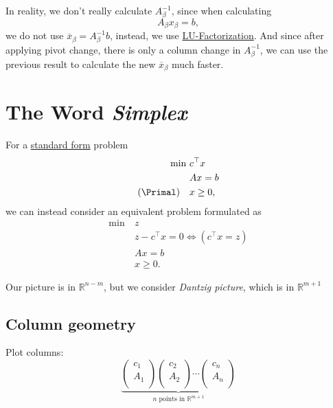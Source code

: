 \begin{note}
	In reality, we don't really calculate \(A^{-1}_{\beta}\), since when calculating
	\[
		A_{\beta}x_{\beta} = b,
	\]
	we do not use \(\overline{x}_{\beta} = A^{-1}_{\beta}b\), instead, we use \href{https://en.wikipedia.org/wiki/LU_decomposition}{LU-Factorization}. And since after applying pivot change, there is only a column change in \(A^{-1}_{\beta}\), we can use the previous result to calculate the new \(\overline{x}_{\beta}\) much faster.
\end{note}

\section{The Word \emph{Simplex}}
For a \hyperref[def:standard-form]{standard form} problem
\[
	\begin{aligned}
		\min~          & c^{\top}x \\
		               & Ax = b    \\
		(\Primal)\quad & x\geq 0,
	\end{aligned}
\]
we can instead consider an equivalent problem formulated as
\[
	\begin{aligned}
		\min~ & z                                        \\
		      & z - c^{\top} x = 0 \iff (c^{\top} x = z) \\
		      & Ax = b                                   \\
		      & x\geq 0.
	\end{aligned}
\]

\begin{prev}
	Our picture is in \(\mathbb{R}^{n-m}\), but we consider \emph{Dantzig picture}, which is in \(\mathbb{R}^{m+1}\)
\end{prev}

\subsection{Column geometry}
Plot columns:
\[
	\underbrace{
		\begin{pmatrix}
			c_1 \\
			A_1 \\
		\end{pmatrix}
		\begin{pmatrix}
			c_2 \\
			A_2 \\
		\end{pmatrix}
		\cdots
		\begin{pmatrix}
			c_n \\
			A_n \\
		\end{pmatrix}}_{n \text{ points in }\mathbb{R}^{m+1}}
\]

